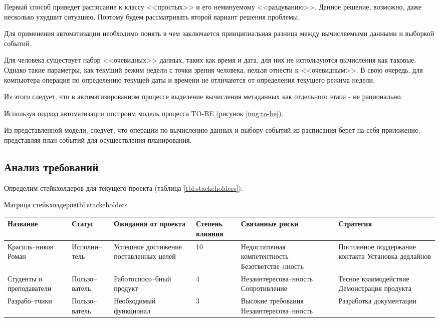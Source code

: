 Первый способ приведет расписание к классу <<простых>> и его неминуемому <<раздуванию>>.
Данное решение, возможно, даже несколько ухудшит ситуацию.
Поэтому будем рассматривать второй вариант решения проблемы.

Для применения автоматизации необходимо понять в чем заключается принципиальная разница между вычисляемыми данными и выборкой событий.

Для человека существует набор <<очевидных>> данных, таких как время и дата, для них не используются вычисления как таковые.
Однако такие параметры, как текущий режим недели с точки зрения человека, нельзя отнести к <<очевидным>>.
В свою очередь, для компьютера операция по определению текущей даты и времени не отличаются от определения текущего режима недели.

Из этого следует, что в автоматизированном процессе выделение вычисления метаданных как отдельного этапа - не рационально.

Используя подход автоматизации построим модель процесса TO-BE (рисунок \ref{img:to-be}).


Из представленной модели, следует, что операции по вычислению данных и выбору событий из расписания берет на себя приложение, представляя план событий для осуществления планирования.

\subsection{Анализ требований}

Определим стейкхолдеров для текущего проекта (таблица \ref{tbl:stackeholders}).

\begin{tbl}{Матрица стейкхолдеров}{tbl:stackeholders}
  \begin{tabularx}{\textwidth}{| p{1.6cm} | p{1.5cm} | X | p{1.5cm} | X | X |}
  \hline Название
  & Статус
  & Ожидания от проекта
  & Степень влияния
  & Связанные риски
  & Стратегия \\
  \hline Красиль--ников Роман
  & Исполни--тель
  & Успешное достижение поставленных целей
  & 10
  & Недостаточная компетентность \newline Безответстве--нность
  & Постоянное поддержание контакта \newline Установка дедлайнов \\
  \hline Студенты и преподаватели
  & Пользо--ватель
  & Работоспосо--бный продукт
  & 4
  & Незаинтересова--нность \newline Сопротивление
  & Тесное взаимодействие \newline Демонстрация продукта \\
  \hline Разрабо--тчики
  & Пользо--ватель
  & Необходимый функционал
  & 3
  & Высокие требования \newline Незаинтересова--нность
  & Разработка документации \\
  \hline
  \end{tabularx}
\end{tbl}

